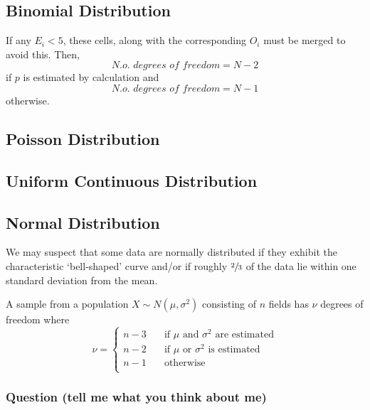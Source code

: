 \documentclass{article}
\begin{document}
\subsection{Binomial Distribution}

If any $E_i < 5$, these cells, along with the corresponding $O_i$ must be merged
to avoid this. Then, \[\textit{N.o. degrees of freedom} = N - 2\] if $p$ is
estimated by calculation and \[\textit{N.o. degrees of freedom} = N - 1\]
otherwise.

\subsection{Poisson Distribution}

\subsection{Uniform Continuous Distribution}

\subsection{Normal Distribution}

We may suspect that some data are normally distributed if they exhibit the
characteristic `bell-shaped' curve and/or if roughly $\sfrac{2}{3}$ of the data
lie within one standard deviation from the mean.

A sample from a population $X \sim N\left(\mu, \sigma^2\right)$ consisting of $n$
fields has $\nu$ degrees of freedom where \[\nu = 
\begin{cases} 
    n - 3 & \quad \text{if } \mu \text{ and } \sigma^2 \text{ are estimated} \\
    n - 2 & \quad \text{if } \mu \text{ or } \sigma^2 \text{ is estimated} \\
    n - 1 & \quad \text{otherwise} \\
\end{cases}\]

\subsubsection{Question (tell me what you think about me)}
\end{document}
